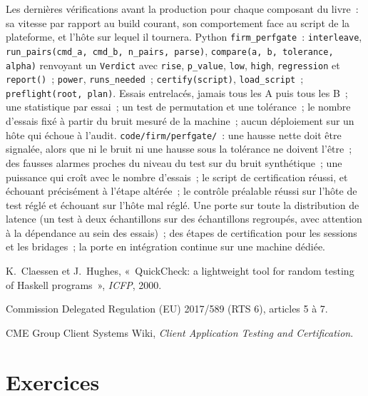 \begin{build}
 Les dernières vérifications avant la production pour chaque composant du livre~: sa vitesse par rapport au build courant,
son comportement face au script de la plateforme, et l'hôte sur lequel il tournera.
 Python \texttt{firm\_perfgate}~: \texttt{interleave}, \texttt{run\_pairs(cmd\_a, cmd\_b, n\_pairs, parse)},
\texttt{compare(a, b, tolerance, alpha)} renvoyant un \texttt{Verdict} avec \texttt{rise}, \texttt{p\_value}, \texttt{low},
\texttt{high}, \texttt{regression} et \texttt{report()}~; \texttt{power}, \texttt{runs\_needed}~; \texttt{certify(script)},
\texttt{load\_script}~; \texttt{preflight(root, plan)}.
 Essais entrelacés, jamais tous les A puis tous les B~; une statistique par essai~; un test de permutation et une tolérance~; le
nombre d'essais fixé à partir du bruit mesuré de la machine~; aucun déploiement sur un hôte qui échoue à l'audit.
 \texttt{code/firm/perfgate/}~: une hausse nette doit être signalée, alors que ni le bruit ni une hausse sous la tolérance ne doivent l'être~; des fausses
alarmes proches du niveau du test sur du bruit synthétique~; une puissance qui croît avec le nombre d'essais~; le script de certification réussi,
et échouant précisément à l'étape altérée~; le contrôle préalable réussi sur l'hôte de test réglé et échouant sur l'hôte mal réglé.
 Une porte sur toute la distribution de latence (un test à deux échantillons sur des échantillons regroupés, avec attention à la dépendance au sein des
essais)~; des étapes de certification pour les sessions et les bridages~; la porte en intégration continue sur une machine dédiée.
\end{build}

\begin{omsources}
\item K.~Claessen et J.~Hughes, «~QuickCheck: a lightweight tool for random testing of Haskell programs~», \emph{ICFP}, 2000.
\item Commission Delegated Regulation (EU) 2017/589 (RTS 6), articles 5 à 7.
\item CME Group Client Systems Wiki, \emph{Client Application Testing and Certification}.
\end{omsources}

\section{Exercices}

